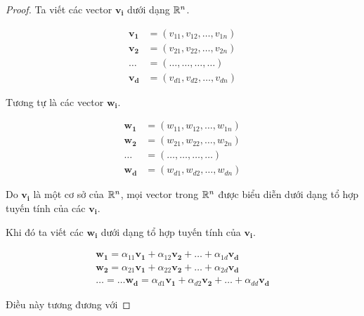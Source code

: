 \begin{proof}
    Ta viết các vector $\bm{v_i}$ dưới dạng $\mathbb{R}^n$.

    \begin{align*}
        \bm{v_1} & = (v_{11}, v_{12}, \ldots, v_{1n}) \\
        \bm{v_2} & = (v_{21}, v_{22}, \ldots, v_{2n}) \\
        \ldots & = (\ldots, \ldots, \ldots, \ldots) \\
        \bm{v_d} & = (v_{d1}, v_{d2}, \ldots, v_{dn})
    \end{align*}

    Tương tự là các vector $\bm{w_i}$.

    \begin{align*}
        \bm{w_1} & = (w_{11}, w_{12}, \ldots, w_{1n}) \\
        \bm{w_2} & = (w_{21}, w_{22}, \ldots, w_{2n}) \\
        \ldots & = (\ldots, \ldots, \ldots, \ldots) \\
        \bm{w_d} & = (w_{d1}, w_{d2}, \ldots, w_{dn})
    \end{align*}

    Do $\bm{v_i}$ là một cơ sở của $\mathbb{R}^n$, mọi vector trong $\mathbb{R}^n$ được biểu diễn dưới dạng tổ hợp tuyến tính của các $\bm{v_i}$.

    Khi đó ta viết các $\bm{w_i}$ dưới dạng tổ hợp tuyến tính của $\bm{v_i}$.

    \begin{align*}
        \bm{w_1} = \alpha_{11} \bm{v_1} + \alpha_{12} \bm{v_2} + \ldots + \alpha_{1d} \bm{v_d} \\
        \bm{w_2} = \alpha_{21} \bm{v_1} + \alpha_{22} \bm{v_2} + \ldots + \alpha_{2d} \bm{v_d} \\
        \ldots = \ldots
        \bm{w_d} = \alpha_{d1} \bm{v_1} + \alpha_{d2} \bm{v_2} + \ldots + \alpha_{dd} \bm{v_d}
    \end{align*}

    Điều này tương đương với 


\end{proof}
